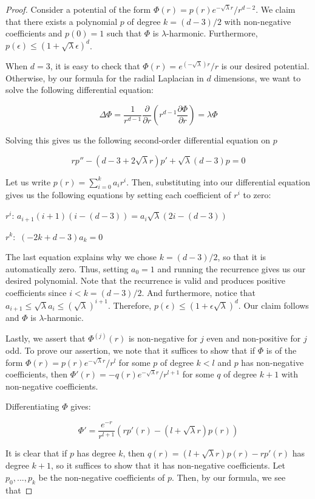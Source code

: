 \begin{proof}
Consider a potential of the form $\Phi(r) = p(r)e^{-\sqrt{\lambda}r}/r^{d-2}$. We claim that there exists a polynomial $p$ of degree $k = (d-3)/2$ with non-negative coefficients and $p(0) = 1$ such that $\Phi$ is $\lambda$-harmonic. Furthermore, $p(\epsilon) \leq (1+\sqrt{\lambda}\epsilon)^d$.

When $d = 3$, it is easy to check that $\Phi(r) = e^{(-\sqrt{\lambda})r}/r$ is our desired potential. Otherwise, by our formula for the radial Laplacian in $d$ dimensions, we want to solve the following differential equation:

\[\Delta \Phi =  \frac{1}{r^{d-1}} \frac{\partial}{\partial r} (r^{d-1} \frac{\partial \Phi}{\partial r}) =\lambda \Phi\]

Solving this gives us the following second-order differential equation on $p$

\[rp'' - (d-3+2\sqrt{\lambda}r)p' +\sqrt{\lambda} (d-3)p = 0\]

Let us write $p(r) = \sum_{i=0}^k a_i r^i$. Then, substituting into our differential equation gives us the following equations by setting each coefficient of $r^i$ to zero:

$r^i$:  $a_{i+1}(i+1)(i - (d-3)) = a_i \sqrt{\lambda} (2i-(d-3))$

$r^k:$ $(-2k +d-3)a_k = 0$

The last equation explains why we chose $k = (d-3)/2$, so that it is automatically zero. Thus, setting $a_0 = 1$ and running the recurrence gives us our desired polynomial. Note that the recurrence is valid and produces positive coefficients since $i < k  = (d-3)/2$. And furthermore, notice that $a_{i+1} \leq \sqrt{\lambda} a_i \leq (\sqrt{\lambda})^{i+1}$. Therefore, $p(\epsilon) \leq (1+\epsilon\sqrt{\lambda})^d$. Our claim follows and $\Phi$ is $\lambda$-harmonic.

Lastly, we assert that $\Phi^{(j)}(r)$ is non-negative for $j$ even and non-positive for $j$ odd. To prove our assertion, we note that it suffices to show that if $\Phi$ is of the form $\Phi(r) = p(r) e^{-\sqrt{\lambda}r}/r^{l}$ for some $p$ of degree $k < l$ and $p$ has non-negative coefficients, then $\Phi'(r) = - q(r) e^{-\sqrt{\lambda}r}/r^{l+1}$ for some $q$ of degree $k+1$ with non-negative coefficients. 

Differentiating $\Phi$ gives:

\[\Phi' = \frac{e^{-r}}{r^{l+1}} (rp'(r) - (l + \sqrt{\lambda} r)p(r))\]

It is clear that if $p$ has degree $k$, then $q(r) = (l+\sqrt{\lambda} r)p(r) - rp'(r)$ has degree $k+1$, so it suffices to show that it has non-negative coefficients. Let $p_0,..., p_k$ be the non-negative coefficients of $p$. Then, by our formula, we see that 


\end{proof}
